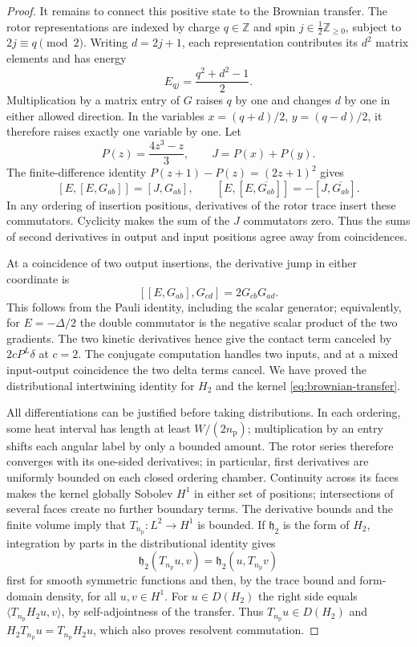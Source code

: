 \begin{proof}
It remains to connect this positive state to the Brownian transfer.
The rotor representations are indexed by charge $q\in\mathbb Z$ and spin
$j\in\frac12\mathbb Z_{\ge0}$, subject to $2j\equiv q\pmod2$.
Writing $d=2j+1$, each representation contributes its $d^2$ matrix elements
and has energy
\[
 E_{qj}=\frac{q^2+d^2-1}{2}.
\]
Multiplication by a matrix entry of $G$ raises $q$ by one and changes $d$
by one in either allowed direction.  In the variables
$x=(q+d)/2$, $y=(q-d)/2$, it therefore raises exactly one variable by one.
Let
\[
 P(z)=\frac{4z^3-z}{3},\qquad
 J=P(x)+P(y).
\]
The finite-difference identity $P(z+1)-P(z)=(2z+1)^2$ gives
\[
 [E,[E,G_{ab}]]=[J,G_{ab}],\qquad
 [E,[E,\overline{G_{ab}}]]=-[J,\overline{G_{ab}}].
\]
In any ordering of insertion positions, derivatives of the rotor trace
insert these commutators.  Cyclicity makes the sum of the $J$ commutators
zero.  Thus the sums of second derivatives in output and input positions
agree away from coincidences.

At a coincidence of two output insertions, the derivative jump in either
coordinate is
\[
 [[E,G_{ab}],G_{cd}]=2G_{cb}G_{ad}.
\]
This follows from the Pauli identity, including the scalar generator;
equivalently, for $E=-\Delta/2$ the double commutator is the negative
scalar product of the two gradients.  The two kinetic derivatives hence
give the contact term canceled by $2cP^L\delta$ at $c=2$.
The conjugate computation handles two inputs, and at a mixed input-output
coincidence the two delta terms cancel.  We have proved the distributional
intertwining identity for $H_2$ and the kernel
\eqref{eq:brownian-transfer}.

All differentiations can be justified before taking distributions.  In
each ordering, some heat interval has length at least $W/(2n_{\mathrm p})$;
multiplication by an entry shifts each angular label by only a bounded
amount.  The rotor series therefore converges with its one-sided
derivatives; in particular, first derivatives are uniformly bounded on
each closed ordering chamber.  Continuity
across its faces makes the kernel globally Sobolev $H^1$ in either set
of positions; intersections of several faces create no further boundary
terms.  The derivative bounds and the finite volume imply that
$T_{n_{\mathrm p}}:L^2\to H^1$ is bounded.  If $\mathfrak h_2$ is the form
of $H_2$, integration by parts in the distributional identity gives
\[
 \mathfrak h_2(T_{n_{\mathrm p}}u,v)
       =\mathfrak h_2(u,T_{n_{\mathrm p}}v)
\]
first for smooth symmetric functions and then, by the trace bound and
form-domain density, for all $u,v\in H^1$.  For $u\in D(H_2)$ the right
side equals $\langle T_{n_{\mathrm p}}H_2u,v\rangle$, by self-adjointness
of the transfer.  Thus $T_{n_{\mathrm p}}u\in D(H_2)$ and
$H_2T_{n_{\mathrm p}}u=T_{n_{\mathrm p}}H_2u$, which also proves
resolvent commutation.


\end{proof}
